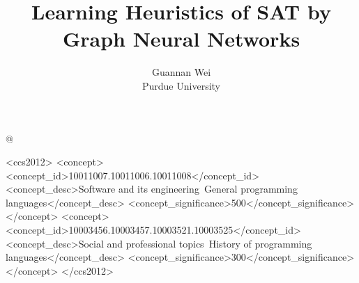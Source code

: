\documentclass[sigplan,10pt]{acmart}\settopmatter{printfolios=true,printccs=false,printacmref=false}
\begin{document}
\title{Learning Heuristics of SAT by Graph Neural Networks}         %

\author
[Guannan Wei]
{Guannan Wei \\ Purdue University}

\lstMakeShortInline[keywordstyle=,%
              flexiblecolumns=false,%
              mathescape=false,%
              basicstyle=\tt]@



\begin{CCSXML}
<ccs2012>
<concept>
<concept_id>10011007.10011006.10011008</concept_id>
<concept_desc>Software and its engineering~General programming languages</concept_desc>
<concept_significance>500</concept_significance>
</concept>
<concept>
<concept_id>10003456.10003457.10003521.10003525</concept_id>
<concept_desc>Social and professional topics~History of programming languages</concept_desc>
<concept_significance>300</concept_significance>
</concept>
</ccs2012>
\end{CCSXML}

\end{document}
